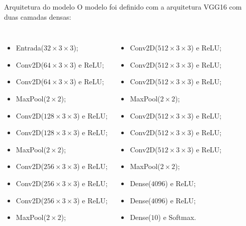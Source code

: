 \begin{frame}{Arquitetura do modelo}
O modelo foi definido com a arquitetura VGG16 com duas camadas densas:
\begin{columns}[T,c]
      \scriptsize
      \begin{itemize}
        \item Entrada($32 \times 3 \times 3$);
        \item Conv2D($64 \times 3 \times 3$) e ReLU;
        \item Conv2D($64 \times 3 \times 3$) e ReLU;
        \item MaxPool($2 \times 2$);
        \item Conv2D($128 \times 3 \times 3$) e ReLU;
        \item Conv2D($128 \times 3 \times 3$) e ReLU;
        \item MaxPool($2 \times 2$);
        \item Conv2D($256 \times 3 \times 3$) e ReLU;
        \item Conv2D($256 \times 3 \times 3$) e ReLU;
        \item Conv2D($256 \times 3 \times 3$) e ReLU;
        \item MaxPool($2 \times 2$);
      \end{itemize}
      \scriptsize
      \begin{itemize}
        \item Conv2D($512 \times 3 \times 3$) e ReLU;
        \item Conv2D($512 \times 3 \times 3$) e ReLU;
        \item Conv2D($512 \times 3 \times 3$) e ReLU;
        \item MaxPool($2 \times 2$);
        \item Conv2D($512 \times 3 \times 3$) e ReLU;
        \item Conv2D($512 \times 3 \times 3$) e ReLU;
        \item Conv2D($512 \times 3 \times 3$) e ReLU;
        \item MaxPool($2 \times 2$);
        \item Dense($4096$) e ReLU;
        \item Dense($4096$) e ReLU;
        \item Dense($10$) e Softmax.
      \end{itemize}
    \end{columns}
\end{frame}

